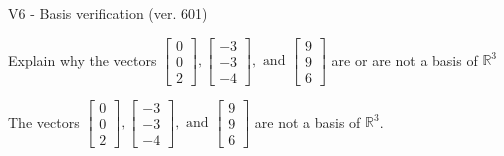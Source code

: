 \begin{exercise}
  \begin{exerciseTitle}V6 - Basis verification (ver. 601)\end{exerciseTitle}
  \begin{exerciseStatement}
    Explain why the vectors \(\left[\begin{array}{r}
0 \\
0 \\
2
\end{array}\right] , \left[\begin{array}{r}
-3 \\
-3 \\
-4
\end{array}\right] , \text{ and } \left[\begin{array}{r}
9 \\
9 \\
6
\end{array}\right]\) are or are not a basis of \(\mathbb{R}^3\)	


  \end{exerciseStatement}
  \begin{exerciseAnswer}
   The vectors \(\left[\begin{array}{r}
0 \\
0 \\
2
\end{array}\right] , \left[\begin{array}{r}
-3 \\
-3 \\
-4
\end{array}\right] , \text{ and } \left[\begin{array}{r}
9 \\
9 \\
6
\end{array}\right]\) 
  	 are not  a basis of \(\mathbb{R}^3\).
  


  \end{exerciseAnswer}
\end{exercise}